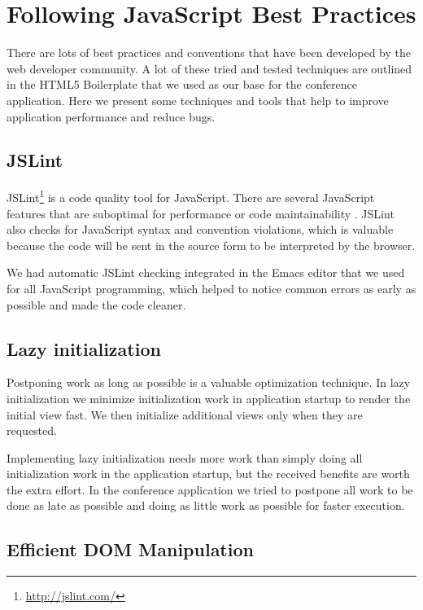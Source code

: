 \section{Following JavaScript Best Practices}
\label{section:js-best-practices}

There are lots of best practices and conventions that have been
developed by the web developer community. A lot of these tried and
tested techniques are outlined in the HTML5 Boilerplate
\citationneeded that we used as our base for the conference
application. Here we present some techniques and tools that help to
improve application performance and reduce bugs.

\subsection{JSLint}

JSLint\footnote{\url{http://jslint.com/}} is a code quality tool for
JavaScript. There are several JavaScript features that are suboptimal
for performance or code maintainability
\cite{crockford2008javascript}. JSLint also checks for JavaScript
syntax and convention violations, which is valuable because the code
will be sent in the source form to be interpreted by the browser.

We had automatic JSLint checking integrated in the Emacs
\citationneeded editor that we used for all JavaScript programming,
which helped to notice common errors as early as possible and made the
code cleaner.

\subsection{Lazy initialization}

Postponing work as long as possible is a valuable optimization
technique. In lazy initialization we minimize initialization work in
application startup to render the initial view fast. We then
initialize additional views only when they are requested.

Implementing lazy initialization needs more work than simply doing all
initialization work in the application startup, but the received
benefits are worth the extra effort. In the conference application we
tried to postpone all work to be done as late as possible and doing as
little work as possible for faster execution.

\subsection{Efficient DOM Manipulation}

